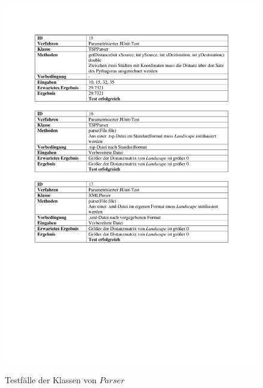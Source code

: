 \begin{appendices}
	\begin{figure}[h]
		\centering
		\caption{Testfälle der Klassen von $Parser$}
		\includegraphics[width=\linewidth]{images/Testfaelle_Parser_Seite_1.pdf}
		\label{testParser1}
	\end{figure}


\end{appendices}
